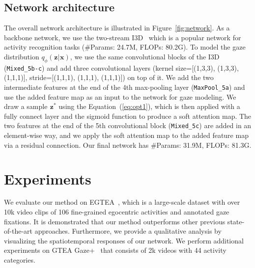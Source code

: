 \documentclass[10pt,twocolumn,letterpaper]{article}
\newcommand{\varx}{\mathbf{\mspace{1mu}x}}
\newcommand{\varz}{\mathbf{\mspace{1mu}z}}
\begin{document}
\subsection{Network architecture} \label{subsec:network}

The overall network architecture is illustrated in Figure~\ref{fig:network}. As a backbone network, we use the two-stream I3D~\cite{carreira2017quo} which is a popular network for activity recognition tasks (\#Params: 24.7M, FLOPs: 80.2G). To model the gaze distribution $q_{\phi}(\varz|\varx)$, we use the same convolutional blocks of the I3D (\texttt{Mixed\_5b-c}) and add three convolutional layers (kernel size=[(1,3,3), (1,3,3), (1,1,1)], stride=[(1,1,1), (1,1,1), (1,1,1)]) on top of it. We add the two intermediate features at the end of the 4th max-pooling layer (\texttt{MaxPool\_5a}) and use the added feature map as an input to the network for gaze modeling. We draw a sample $\varz^*$ using the Equation~(\ref{eq:opt1}), which is then applied with a fully connect layer and the sigmoid function to produce a soft attention map. The two features at the end of the 5th convolutional block (\texttt{Mixed\_5c}) are added in an element-wise way, and we apply the soft attention map to the added feature map via a residual connection. Our final network has \#Params: 31.9M, FLOPs: 81.3G.

\section{Experiments} \label{sec:exp}
We evaluate our method on EGTEA~\cite{li2018eye}, which is a large-scale dataset with over 10k video clips of 106 fine-grained egocentric activities and annotated gaze fixations. It is demonstrated that our method outperforms other previous state-of-the-art approaches. Furthermore, we provide a qualitative analysis by visualizing the spatiotemporal responses of our network. We perform additional experiments on GTEA Gaze+~\cite{li2015delving} that consists of 2k videos with 44 activity categories.
\end{document}

